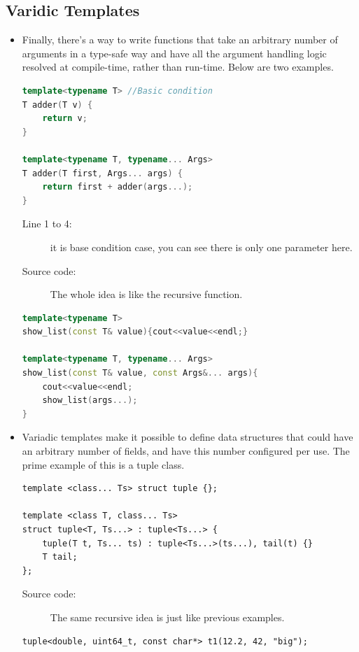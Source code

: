 \documentclass[a4paper,11pt,twoside]{book}
\begin{document}
\subsection{Varidic Templates}
\begin{itemize}
\item Finally, there's a way to write functions that take an arbitrary number of arguments in a type-safe way and have all the argument handling logic resolved at compile-time, rather than run-time. Below are two examples.

\begin{lstlisting}[frame=single, language=c++]
template<typename T> //Basic condition
T adder(T v) {
	return v;
}

template<typename T, typename... Args>
T adder(T first, Args... args) {
	return first + adder(args...);
}
\end{lstlisting}
\begin{description}
	\item[Line 1 to 4:] it is base condition case, you can see there is only one parameter here.
	\item[Source code:] The whole idea is like the recursive function.
\end{description}

\begin{lstlisting}[frame=single, language=c++]
template<typename T>
show_list(const T& value){cout<<value<<endl;}

template<typename T, typename... Args>
show_list(const T& value, const Args&... args){
	cout<<value<<endl;
	show_list(args...);
}
\end{lstlisting}

\item Variadic templates make it possible to define data structures that could have an arbitrary number of fields, and have this number configured per use. The prime example of this is a tuple class.
\begin{lstlisting}
template <class... Ts> struct tuple {};

template <class T, class... Ts>
struct tuple<T, Ts...> : tuple<Ts...> {
	tuple(T t, Ts... ts) : tuple<Ts...>(ts...), tail(t) {}
	T tail;
};
\end{lstlisting}
\begin{description}
	\item[Source code:] The same recursive idea is just like previous examples.
\end{description}
\begin{lstlisting}
tuple<double, uint64_t, const char*> t1(12.2, 42, "big");


\end{lstlisting}
\end{itemize}
\end{document}

